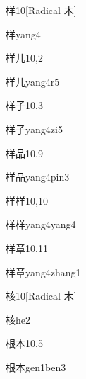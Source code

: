 \begin{entry}{样}{10}[Radical 木]
  \begin{phonetics}{样}{yang4}
  \end{phonetics}
\end{entry}

\begin{entry}{样儿}{10,2}
  \begin{phonetics}{样儿}{yang4r5}
  \end{phonetics}
\end{entry}

\begin{entry}{样子}{10,3}
  \begin{phonetics}{样子}{yang4zi5}
  \end{phonetics}
\end{entry}

\begin{entry}{样品}{10,9}
  \begin{phonetics}{样品}{yang4pin3}
  \end{phonetics}
\end{entry}

\begin{entry}{样样}{10,10}
  \begin{phonetics}{样样}{yang4yang4}
  \end{phonetics}
\end{entry}

\begin{entry}{样章}{10,11}
  \begin{phonetics}{样章}{yang4zhang1}
  \end{phonetics}
\end{entry}

\begin{entry}{核}{10}[Radical 木]
  \begin{phonetics}{核}{he2}
  \end{phonetics}
\end{entry}

\begin{entry}{根本}{10,5}
  \begin{phonetics}{根本}{gen1ben3}
  \end{phonetics}
\end{entry}

